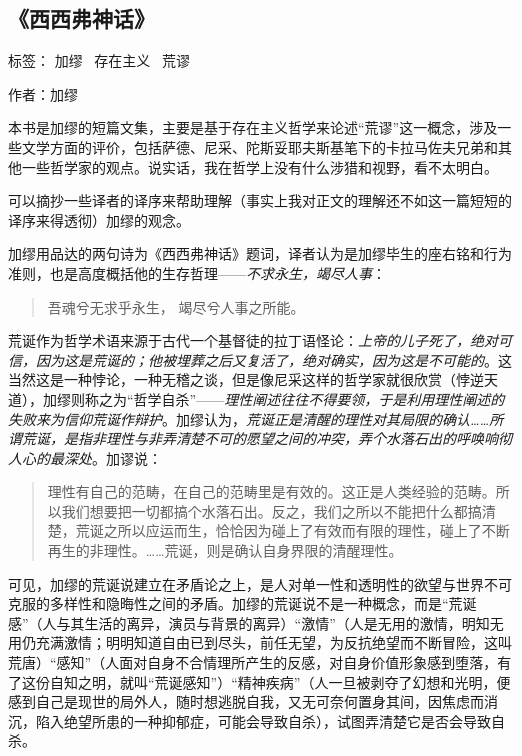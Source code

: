 \subsection{《西西弗神话》}

标签： 加缪 \ 存在主义 \ 荒谬

作者：加缪

本书是加缪的短篇文集，主要是基于存在主义哲学来论述“荒谬”这一概念，涉及一些文学方面的评价，包括萨德、尼采、陀斯妥耶夫斯基笔下的卡拉马佐夫兄弟和其他一些哲学家的观点。说实话，我在哲学上没有什么涉猎和视野，看不太明白。

可以摘抄一些译者的译序来帮助理解（事实上我对正文的理解还不如这一篇短短的译序来得透彻）加缪的观念。

加缪用品达的两句诗为《西西弗神话》题词，译者认为是加缪毕生的座右铭和行为准则，也是高度概括他的生存哲理——\emph{不求永生，竭尽人事}：
\begin{quotation}
吾魂兮无求乎永生，
竭尽兮人事之所能。
\end{quotation}

荒诞作为哲学术语来源于古代一个基督徒的拉丁语怪论：\emph{上帝的儿子死了，绝对可信，因为这是荒诞的；他被埋葬之后又复活了，绝对确实，因为这是不可能的}。这当然这是一种悖论，一种无稽之谈，但是像尼采这样的哲学家就很欣赏（悖逆天道），加缪则称之为“哲学自杀”——\emph{理性阐述往往不得要领，于是利用理性阐述的失败来为信仰荒诞作辩护}。加缪认为，\emph{荒诞正是清醒的理性对其局限的确认……所谓荒诞，是指非理性与非弄清楚不可的愿望之间的冲突，弄个水落石出的呼唤响彻人心的最深处}。加谬说：
\begin{quotation}
理性有自己的范畴，在自己的范畴里是有效的。这正是人类经验的范畴。所以我们想要把一切都搞个水落石出。反之，我们之所以不能把什么都搞清楚，荒诞之所以应运而生，恰恰因为碰上了有效而有限的理性，碰上了不断再生的非理性。……荒诞，则是确认自身界限的清醒理性。
\end{quotation}

可见，加缪的荒诞说建立在矛盾论之上，是人对单一性和透明性的欲望与世界不可克服的多样性和隐晦性之间的矛盾。加缪的荒诞说不是一种概念，而是“荒诞感”（人与其生活的离异，演员与背景的离异）“激情”（人是无用的激情，明知无用仍充满激情；明明知道自由已到尽头，前任无望，为反抗绝望而不断冒险，这叫荒唐）“感知”（人面对自身不合情理所产生的反感，对自身价值形象感到堕落，有了这份自知之明，就叫“荒诞感知”）“精神疾病”（人一旦被剥夺了幻想和光明，便感到自己是现世的局外人，随时想逃脱自我，又无可奈何置身其间，因焦虑而消沉，陷入绝望所患的一种抑郁症，可能会导致自杀），试图弄清楚它是否会导致自杀。

